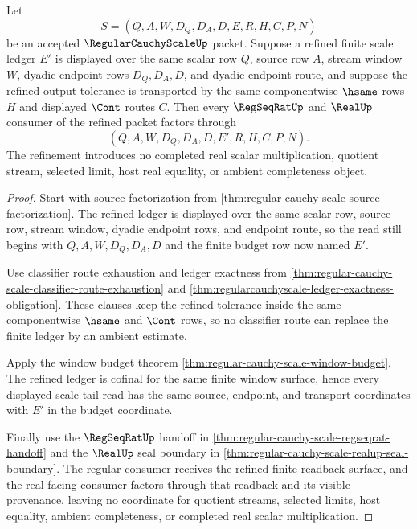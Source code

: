 \begin{theorem}
\label{thm:regular-cauchy-scale-cofinal-budget-refinement}
Let
$$
S=(Q,A,W,D_Q,D_A,D,E,R,H,C,P,N)
$$
be an accepted $\RegularCauchyScaleUp$ packet. Suppose a refined finite scale ledger $E'$ is displayed over the same scalar row $Q$, source row $A$, stream window $W$, dyadic endpoint rows $D_Q,D_A,D$, and dyadic endpoint route, and suppose the refined output tolerance is transported by the same componentwise $\hsame$ rows $H$ and displayed $\Cont$ routes $C$. Then every $\RegSeqRatUp$ and $\RealUp$ consumer of the refined packet factors through
$$
(Q,A,W,D_Q,D_A,D,E',R,H,C,P,N).
$$
The refinement introduces no completed real scalar multiplication, quotient stream, selected limit, host real equality, or ambient completeness object.
\end{theorem}
\begin{proof}
Start with source factorization from \autoref{thm:regular-cauchy-scale-source-factorization}. The refined ledger is displayed over the same scalar row, source row, stream window, dyadic endpoint rows, and endpoint route, so the read still begins with $Q,A,W,D_Q,D_A,D$ and the finite budget row now named $E'$.

Use classifier route exhaustion and ledger exactness from \autoref{thm:regular-cauchy-scale-classifier-route-exhaustion} and \autoref{thm:regularcauchyscale-ledger-exactness-obligation}. These clauses keep the refined tolerance inside the same componentwise $\hsame$ and $\Cont$ rows, so no classifier route can replace the finite ledger by an ambient estimate.

Apply the window budget theorem \autoref{thm:regular-cauchy-scale-window-budget}. The refined ledger is cofinal for the same finite window surface, hence every displayed scale-tail read has the same source, endpoint, and transport coordinates with $E'$ in the budget coordinate.

Finally use the $\RegSeqRatUp$ handoff in \autoref{thm:regular-cauchy-scale-regseqrat-handoff} and the $\RealUp$ seal boundary in \autoref{thm:regular-cauchy-scale-realup-seal-boundary}. The regular consumer receives the refined finite readback surface, and the real-facing consumer factors through that readback and its visible provenance, leaving no coordinate for quotient streams, selected limits, host equality, ambient completeness, or completed real scalar multiplication.
\end{proof}

